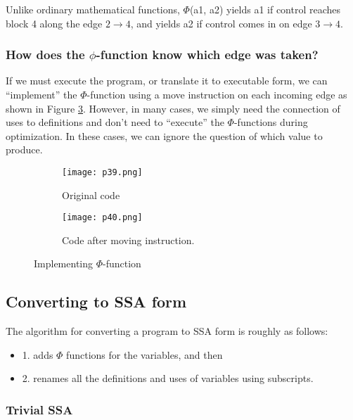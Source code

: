 Unlike ordinary mathematical functions, $\Phi$(a1, a2) yields a1 if control reaches block 4 along the edge $2 \rightarrow 4$, and yields a2 if control comes in on edge $3 \rightarrow 4$.


\subsubsection{How does the $\phi$-function know which edge was taken?}


If we must execute the program, or translate it to executable form, we can “implement” the $\Phi$-function using 
a move instruction on each incoming edge as shown in Figure \ref{fig:p39-40}. However, in many cases, we simply need the connection of uses to definitions and don’t need to “execute” the $\Phi$-functions during optimization. In these cases, we can ignore the question of which value to produce.

\begin{figure}[H]
	\centering
	\begin{subfigure}{0.3\textwidth}
		\centering
		\texttt{[image: p39.png]}
		\caption{Original code}
		\label{fig:p39}
	\end{subfigure}
	\begin{subfigure}{0.3\textwidth}
		\centering
		\texttt{[image: p40.png]}
		\caption{Code after moving instruction.}
		\label{fig:p40}
	\end{subfigure}
	\caption{Implementing $\Phi$-function}
	\label{fig:p39-40}
\end{figure}




\subsection{Converting to SSA form}

The algorithm for converting a program to SSA form is roughly as follows:

\begin{itemize}
	\item 1. adds $\Phi$ functions for the variables, and then
	\item 2. renames all the definitions and uses of variables using subscripts.
\end{itemize}




\subsubsection{Trivial SSA}

